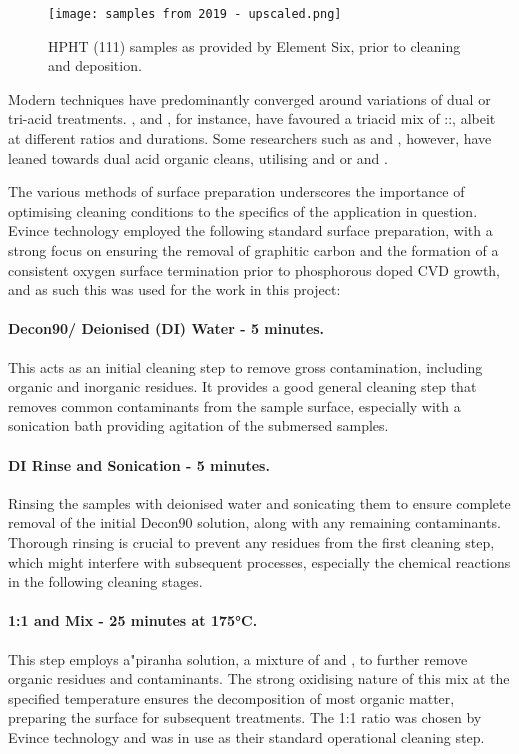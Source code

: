\begin{refsection}
\begin{figure}[h]
\centering
\texttt{[image: samples from 2019 - upscaled.png]}
\caption{HPHT (111) samples as provided by Element Six, prior to cleaning and deposition.}
\label{fig:111_samples}
\end{figure}

Modern techniques have predominantly converged around variations of dual or tri-acid treatments. \cite{koizumi2000, teraji2000,teraji2003}, and \cite{kociniewski2006, kociniewski2007}, for instance, have favoured a triacid mix of ::, albeit at different ratios and durations. Some researchers such as \cite{kato2005,kato2009} and \cite{suzuki2004}, however, have leaned towards dual acid organic cleans, utilising  and  or  and . 

The various methods of surface preparation underscores the importance of optimising cleaning conditions to the specifics of the application in question. Evince technology employed the following standard surface preparation, with a strong focus on ensuring the removal of graphitic carbon and the formation of a consistent oxygen surface termination prior to phosphorous doped CVD growth, and as such this was used for the work in this project:

\paragraph{Decon90/ Deionised (DI) Water - 5 minutes.}
This acts as an initial cleaning step to remove gross contamination, including organic and inorganic residues. It provides a good general cleaning step that removes common contaminants from the sample surface, especially with a sonication bath providing agitation of the submersed samples. 

\paragraph{DI Rinse and Sonication - 5 minutes.}
Rinsing the samples with deionised water and sonicating them to ensure complete removal of the initial Decon90 solution, along with any remaining contaminants. Thorough rinsing is crucial to prevent any residues from the first cleaning step, which might interfere with subsequent processes, especially the chemical reactions in the following cleaning stages.

\paragraph{1:1  and  Mix - 25 minutes at 175\si{\degreeCelsius}.}
This step employs a"piranha solution, a mixture of  and , to further remove organic residues and contaminants. The strong oxidising nature of this mix at the specified temperature ensures the decomposition of most organic matter, preparing the surface for subsequent treatments. The 1:1 ratio was chosen by Evince technology and was in use as their standard operational cleaning step.


\end{refsection}
